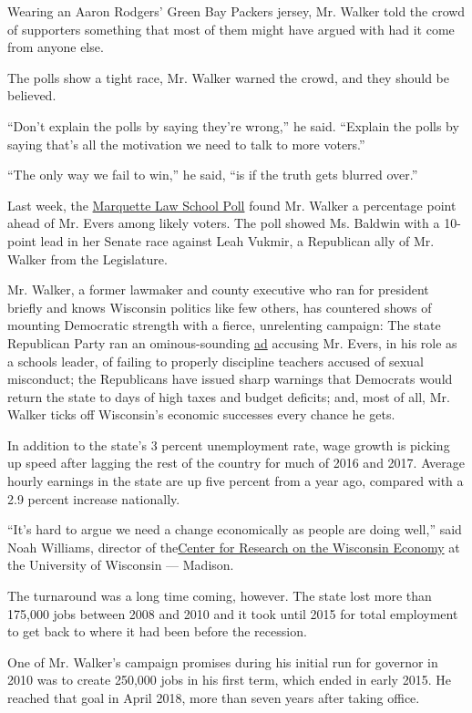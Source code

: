 Wearing an Aaron Rodgers' Green Bay Packers jersey, Mr. Walker told the
crowd of supporters something that most of them might have argued with
had it come from anyone else.

The polls show a tight race, Mr. Walker warned the crowd, and they
should be believed.

``Don't explain the polls by saying they're wrong,'' he said. ``Explain
the polls by saying that's all the motivation we need to talk to more
voters.''

``The only way we fail to win,'' he said, ``is if the truth gets blurred
over.''

Last week, the \href{https://law.marquette.edu/poll/}{Marquette Law
School Poll} found Mr. Walker a percentage point ahead of Mr. Evers
among likely voters. The poll showed Ms. Baldwin with a 10-point lead in
her Senate race against Leah Vukmir, a Republican ally of Mr. Walker
from the Legislature.

Mr. Walker, a former lawmaker and county executive who ran for president
briefly and knows Wisconsin politics like few others, has countered
shows of mounting Democratic strength with a fierce, unrelenting
campaign: The state Republican Party ran an ominous-sounding
\href{https://www.youtube.com/watch?v=75xbRWAqqrI}{ad} accusing Mr.
Evers, in his role as a schools leader, of failing to properly
discipline teachers accused of sexual misconduct; the Republicans have
issued sharp warnings that Democrats would return the state to days of
high taxes and budget deficits; and, most of all, Mr. Walker ticks off
Wisconsin's economic successes every chance he gets.

In addition to the state's 3 percent unemployment rate, wage growth is
picking up speed after lagging the rest of the country for much of 2016
and 2017. Average hourly earnings in the state are up five percent from
a year ago, compared with a 2.9 percent increase nationally.

``It's hard to argue we need a change economically as people are doing
well,'' said Noah Williams, director of
the\href{https://crowe.wisc.edu/}{Center for Research on the Wisconsin
Economy} at the University of Wisconsin --- Madison.

The turnaround was a long time coming, however. The state lost more than
175,000 jobs between 2008 and 2010 and it took until 2015 for total
employment to get back to where it had been before the recession.

One of Mr. Walker's campaign promises during his initial run for
governor in 2010 was to create 250,000 jobs in his first term, which
ended in early 2015. He reached that goal in April 2018, more than seven
years after taking office.

